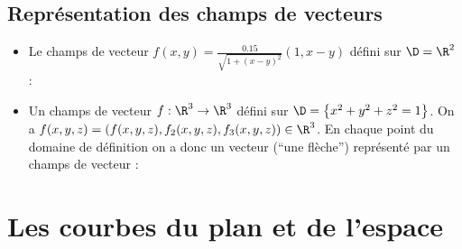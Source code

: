 \subsection{Représentation des champs de vecteurs}

\begin{itemize}
	\item Le champs de vecteur $f(x,y) = \frac{0.15}{\sqrt{1+(x-y)^2}} \left(1, x-y\right )$ défini sur $\D = \R^2$ :
		\begin{center}
			
		\end{center}
	\item Un champs de vecteur $f:\R^3 \to \R^3$ défini sur $\D =\left\{ x^2 + y^2 + z^2 =1 \right\}$. On a $f(x,y,z) = (f(x,y,z),f_2(x,y,z),f_3(x,y,z)) \in \R^3$. En chaque point du domaine de définition on a donc un vecteur (``une flèche'') représenté par un champs de vecteur :
\end{itemize}
			\begin{center}
				
			\end{center}

\section{Les courbes du plan et de l'espace}


